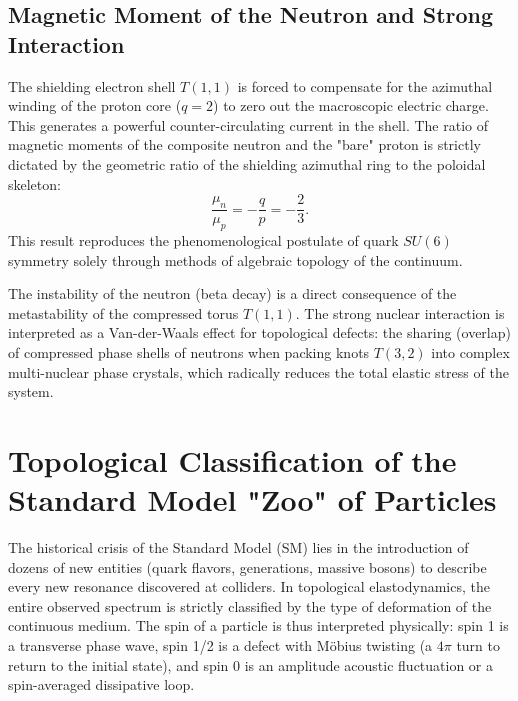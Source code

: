 \documentclass[11pt,a4paper]{article}
\begin{document}
\subsection{Magnetic Moment of the Neutron and Strong Interaction}
The shielding electron shell $T(1,1)$ is forced to compensate for the azimuthal winding of the proton core ($q=2$) to zero out the macroscopic electric charge. This generates a powerful counter-circulating current in the shell. The ratio of magnetic moments of the composite neutron and the "bare" proton is strictly dictated by the geometric ratio of the shielding azimuthal ring to the poloidal skeleton:
\begin{equation}
\frac{\mu_n}{\mu_p} = -\frac{q}{p} = -\frac{2}{3}.
\end{equation}
This result reproduces the phenomenological postulate of quark $SU(6)$ symmetry solely through methods of algebraic topology of the continuum.

The instability of the neutron (beta decay) is a direct consequence of the metastability of the compressed torus $T(1,1)$. The strong nuclear interaction is interpreted as a Van-der-Waals effect for topological defects: the sharing (overlap) of compressed phase shells of neutrons when packing knots $T(3,2)$ into complex multi-nuclear phase crystals, which radically reduces the total elastic stress of the system.

\section{Topological Classification of the Standard Model "Zoo" of Particles}

The historical crisis of the Standard Model (SM) lies in the introduction of dozens of new entities (quark flavors, generations, massive bosons) to describe every new resonance discovered at colliders. In topological elastodynamics, the entire observed spectrum is strictly classified by the type of deformation of the continuous medium. The spin of a particle is thus interpreted physically: spin 1 is a transverse phase wave, spin 1/2 is a defect with Möbius twisting (a $4\pi$ turn to return to the initial state), and spin 0 is an amplitude acoustic fluctuation or a spin-averaged dissipative loop.
\end{document}
